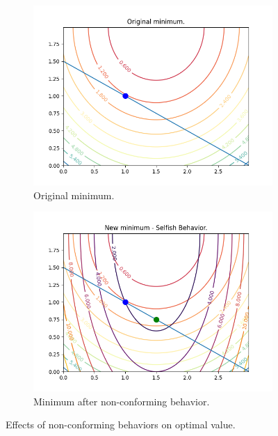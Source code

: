 \documentclass[../main.tex]{subfiles}
\begin{document}
\begin{figure}[h]
  \centering
  \begin{subfigure}{.45\textwidth}
    \includegraphics[width=\textwidth]{../img/original-minimum.png}
    \caption{Original minimum.}
    \label{fig:first}
  \end{subfigure}
  \hfill
  \begin{subfigure}{0.45\textwidth}
    \includegraphics[width=\textwidth]{../img/new-minimum-selfish.png}
    \caption{Minimum after non-conforming behavior.}
    \label{fig:second}
  \end{subfigure}
  \caption{Effects of non-conforming behaviors on optimal value. }
  \label{fig:figures}
\end{figure}
\end{document}
